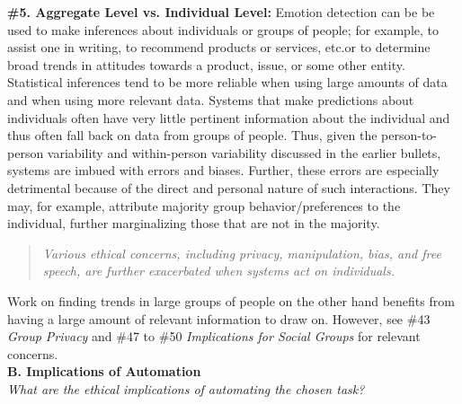 \documentclass{clv3}
\begin{document}
\noindent \textbf{\#5. Aggregate Level vs. Individual Level:} Emotion detection can be be used to make inferences about individuals or groups of people; 
for example, to assist one in writing, to recommend products or services, etc.\@ or to determine broad trends in attitudes towards a product, issue, or some other entity. 
Statistical inferences tend to be more reliable when using large amounts of data and when using more relevant data. Systems that make predictions about individuals often have very little pertinent information about the individual and thus often fall back on data from groups of people. Thus, given the person-to-person variability and within-person variability discussed in the earlier bullets, systems are imbued with errors and biases.
Further, %
these errors are especially detrimental because of the direct and personal nature of such interactions. They may, for example, attribute majority group behavior/preferences to the individual, further marginalizing those that are not in the majority.\\[-20pt]
\begin{quote}
    \textit{Various ethical concerns, including privacy, manipulation, bias, and free speech, are further exacerbated when systems act on individuals.}
\end{quote}
\vspace*{-3mm}
\noindent Work on finding trends in large groups of people on the other hand benefits from having a large amount of relevant information to draw on. However, see \#43 \textit{Group Privacy} and \#47 to \#50 \textit{Implications for Social Groups}  for relevant concerns.\\[3pt]

\noindent \textbf{B. Implications of Automation}\\[2pt]
\textit{What are the ethical implications of automating the chosen task?}\\[5pt]
\end{document}
